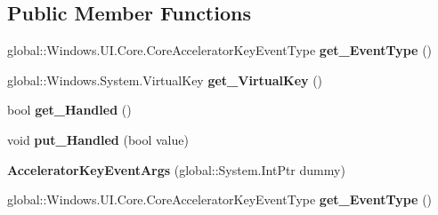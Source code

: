\subsection*{Public Member Functions}
\begin{DoxyCompactItemize}
\item 
\mbox{\label{class_windows_1_1_u_i_1_1_core_1_1_accelerator_key_event_args_a9a5dc0ed03bd53c9e3c96ce9b323ba62}} 
global\+::\+Windows.\+U\+I.\+Core.\+Core\+Accelerator\+Key\+Event\+Type {\bfseries get\+\_\+\+Event\+Type} ()
\item 
\mbox{\label{class_windows_1_1_u_i_1_1_core_1_1_accelerator_key_event_args_a39f6aef5666a666ca9e4e71b3579144c}} 
global\+::\+Windows.\+System.\+Virtual\+Key {\bfseries get\+\_\+\+Virtual\+Key} ()
\item 
\mbox{\label{class_windows_1_1_u_i_1_1_core_1_1_accelerator_key_event_args_a329fc83b7d7c9686615b8d9f1f91c297}} 
bool {\bfseries get\+\_\+\+Handled} ()
\item 
\mbox{\label{class_windows_1_1_u_i_1_1_core_1_1_accelerator_key_event_args_a3d9c66a182b0cf5b679a3869603c5907}} 
void {\bfseries put\+\_\+\+Handled} (bool value)
\item 
\mbox{\label{class_windows_1_1_u_i_1_1_core_1_1_accelerator_key_event_args_af50432bf9a9aaebc40975f48537de074}} 
{\bfseries Accelerator\+Key\+Event\+Args} (global\+::\+System.\+Int\+Ptr dummy)
\item 
\mbox{\label{class_windows_1_1_u_i_1_1_core_1_1_accelerator_key_event_args_a9a5dc0ed03bd53c9e3c96ce9b323ba62}} 
global\+::\+Windows.\+U\+I.\+Core.\+Core\+Accelerator\+Key\+Event\+Type {\bfseries get\+\_\+\+Event\+Type} ()
\item 
\mbox{\label{class_windows_1_1_u_i_1_1_core_1_1_accelerator_key_event_args_a39f6aef5666a666ca9e4e71b3579144c}} 

\end{DoxyCompactItemize}
